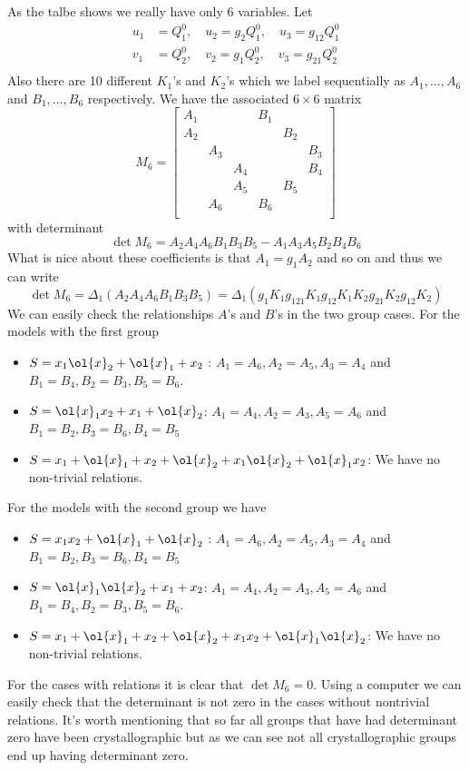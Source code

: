 As the talbe shows we really have only 6 variables. Let
\begin{align*}
	u_1 &= Q_1^0,\quad u_2 = g_2 Q_1^0,\quad u_3 = g_{12}Q_1^0\\
	v_1 &= Q_2^0,\quad v_2 = g_1 Q_2^0,\quad v_3 = g_{21}Q_2^0\\
\end{align*}
Also there are 10 different $K_1$'s and $K_2$'s which we label sequentially as $A_1,\ldots,A_6$ and $B_1,\ldots,B_6$ respectively. We have the associated $ 6 \times 6$ matrix
\[
	M_6 = \begin{bmatrix}
	A_1& & & B_1 & & \\
	A_2& & & & B_2& \\
	& A_3& & & & B_3\\
	& & A_4 & & & B_4\\
	& & A_5& & B_5& \\
	&A_6 & &B_6 & & \\
	\end{bmatrix}
\]
with determinant
\[
	\det M_6 = A_2A_4A_6 B_1 B_3 B_5 - A_1 A_3 A_5 B_2 B_4 B_6
\]
What is nice about these coefficients is that $A_1 = g_1 A_2$ and so on and thus we can write
\[
	\det M_6 = \Delta_1 (A_2A_4A_6 B_1 B_3 B_5) = \Delta_1(g_1K_1 g_{121}K_1g_{12}K_1 K_2 g_{21}K_2 g_{12}K_2)
\]
We can easily check the relationships $A$'s and $B$'s in the two group cases. For the models with the first group
\begin{itemize}
\item $S = x_1\ol{x}_2+\ol{x}_1+x_2$ : $A_1 = A_6, A_2 = A_5, A_3 = A_4$ and $B_1 = B_4, B_2 = B_3, B_5 = B_6$.
\item $S = \ol{x}_1x_2 + x_1 + \ol{x}_2$:  $A_1 = A_4, A_2 = A_3, A_5 = A_6$ and $B_1 = B_2, B_3 = B_6, B_4 = B_5$
\item $S = x_1+\ol{x}_1+x_2+\ol{x}_2+ x_1\ol{x}_2 + \ol{x}_1 x_2$: We have no non-trivial relations.
\end{itemize}
For the models with the second group we have
\begin{itemize}
\item $S = x_1 x_2+\ol{x}_1+\ol{x}_2$ :  $A_1 = A_6, A_2 = A_5, A_3 = A_4$ and $B_1 = B_2, B_3 = B_6, B_4 = B_5$
\item $S = \ol{x}_1\ol{x}_2 + x_1 + x_2$: $A_1 = A_4, A_2 = A_3, A_5 = A_6$ and $B_1 = B_4, B_2 = B_3, B_5 = B_6$.
\item $S = x_1+\ol{x}_1+x_2+\ol{x}_2+ x_1x_2 + \ol{x}_1\ol{x}_2$: We have no non-trivial relations.
\end{itemize}
For the cases with relations it is clear that $\det M_6 = 0$. Using a computer we can easily check that the determinant is not zero in the cases without nontrivial relations. It's worth mentioning that so far all groups that have had determinant zero have been crystallographic but as we can see not all crystallographic groups end up having determinant zero. 

